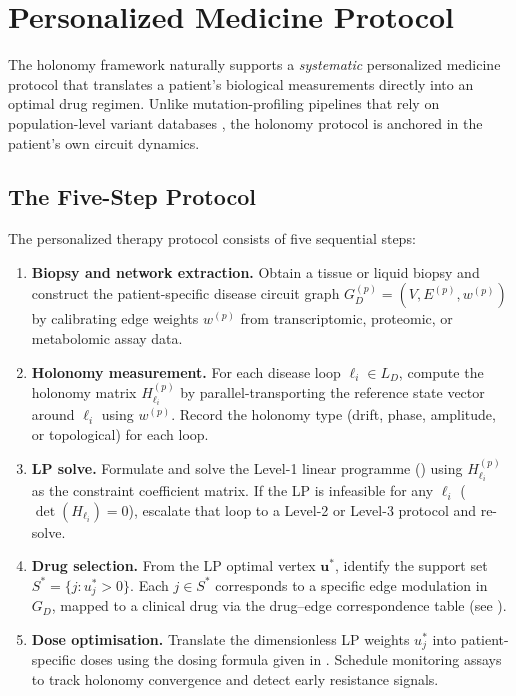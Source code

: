 \section{Personalized Medicine Protocol}
\label{sec:ch10-personalized}

The holonomy framework naturally supports a \emph{systematic} personalized
medicine protocol that translates a patient's biological measurements directly
into an optimal drug regimen.  Unlike mutation-profiling pipelines that rely on
population-level variant databases \citep{Meric-Bernstam2015}, the holonomy
protocol is anchored in the patient's own circuit dynamics.

\subsection{The Five-Step Protocol}

\begin{definition}
\label{def:ch10-protocol}
The personalized therapy protocol consists of five sequential steps:
\begin{enumerate}
  \item \textbf{Biopsy and network extraction.}  Obtain a tissue or liquid
        biopsy and construct the patient-specific disease circuit graph
        $G_D^{(p)} = (V, E^{(p)}, w^{(p)})$ by calibrating edge weights $w^{(p)}$
        from transcriptomic, proteomic, or metabolomic assay data.

  \item \textbf{Holonomy measurement.}  For each disease loop $\ell_i \in L_D$,
        compute the holonomy matrix $H_{\ell_i}^{(p)}$ by parallel-transporting
        the reference state vector around $\ell_i$ using $w^{(p)}$.  Record the
        holonomy type (drift, phase, amplitude, or topological) for each loop.

  \item \textbf{LP solve.}  Formulate and solve the Level-1 linear programme
        () using $H_{\ell_i}^{(p)}$ as the constraint
        coefficient matrix.  If the LP is infeasible for any $\ell_i$
        ($\det(H_{\ell_i}) = 0$), escalate that loop to a Level-2 or Level-3
        protocol and re-solve.

  \item \textbf{Drug selection.}  From the LP optimal vertex $\mathbf{u}^*$,
        identify the support set $S^* = \{j : u^*_j > 0\}$.  Each $j \in S^*$
        corresponds to a specific edge modulation in $G_D$, mapped to a clinical
        drug via the drug--edge correspondence table (see
        ).

  \item \textbf{Dose optimisation.}  Translate the dimensionless LP weights
        $u^*_j$ into patient-specific doses using the dosing formula given in
        .  Schedule monitoring assays to track holonomy
        convergence and detect early resistance signals.
\end{enumerate}
\end{definition}

